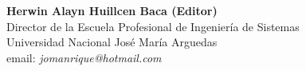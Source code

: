 \begin{center}
\textbf{Herwin Alayn Huillcen Baca (Editor)}\\
Director de la Escuela Profesional de Ingeniería de Sistemas \\
Universidad Nacional José María Arguedas \\
email: \textit{jomanrique@hotmail.com}\\
\end{center}

